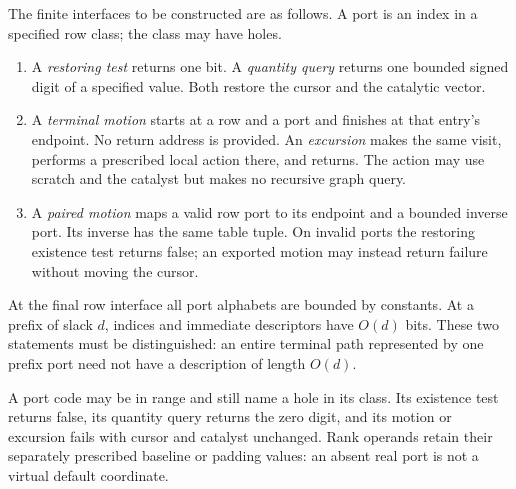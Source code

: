 The finite interfaces to be constructed are as follows.  A port is an
index in a specified row class; the class may have holes.
\begin{enumerate}
\item A \emph{restoring test} returns one bit.  A \emph{quantity query}
  returns one bounded signed digit of a specified value.  Both restore
  the cursor and the catalytic vector.
\item A \emph{terminal motion} starts at a row and a port and finishes at
  that entry's endpoint.  No return address is provided.  An
  \emph{excursion} makes the same visit, performs a prescribed local
  action there, and returns.  The action may use scratch and the catalyst
  but makes no recursive graph query.
\item A \emph{paired motion} maps a valid row port to its endpoint and a
  bounded inverse port.  Its inverse has the same table tuple.  On
  invalid ports the restoring existence test returns false; an exported
  motion may instead return failure without moving the cursor.
\end{enumerate}
At the final row interface all port alphabets are bounded by constants.
At a prefix of slack $d$, indices and immediate descriptors have $O(d)$
bits.  These two statements must be distinguished: an entire terminal
path represented by one prefix port need not have a description of
length $O(d)$.

A port code may be in range and still name a hole in its class.  Its
existence test returns false, its quantity query returns the zero digit,
and its motion or excursion fails with cursor and catalyst unchanged.
Rank operands retain their separately prescribed baseline or padding
values: an absent real port is not a virtual default coordinate.

